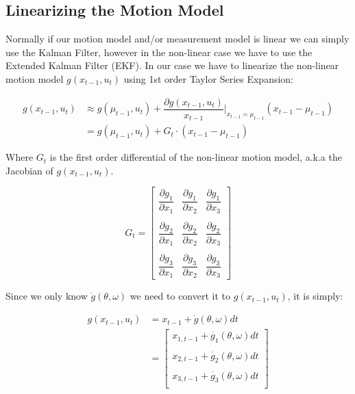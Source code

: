 \documentclass{article}
\begin{document}
\subsection{Linearizing the Motion Model}
\label{subsec:ekf_motion_model_linearization}
Normally if our motion model and/or measurement model is linear we can simply 
use the Kalman Filter, however in the non-linear case we have to use the 
Extended Kalman Filter (EKF). In our case we have to linearize the non-linear 
motion model $g(x_{t-1}, u_{t})$ using 1st order Taylor Series Expansion:

\begin{align}
	g(x_{t-1}, u_{t}) 
	& \approx 	
		g(\mu_{t - 1}, u_{t}) 
			+ \dfrac{\partial g(x_{t-1}, u_{t})}{x_{t - 1}} 
				\bigg|_{x_{t - 1} = \mu_{t - 1}}
			(x_{t - 1} - \mu_{t - 1}) \\
	& = g(\mu_{t - 1}, u_{t}) + G_{t} \cdot (x_{t - 1} - \mu_{t - 1})
\end{align}

Where $G_{t}$ is the first order differential of the non-linear motion model, 
a.k.a the Jacobian of $g(x_{t-1}, u_{t})$.

\begin{equation}
	G_{t} = \begin{bmatrix}
		\dfrac{\partial g_{1}}{\partial x_{1}}
		& \dfrac{\partial g_{1}}{\partial x_{2}} 
		& \dfrac{\partial g_{1}}{\partial x_{3}} \\ \\
		\dfrac{\partial g_{2}}{\partial x_{1}}
		& \dfrac{\partial g_{2}}{\partial x_{2}} 
		& \dfrac{\partial g_{2}}{\partial x_{3}} \\ \\
		\dfrac{\partial g_{3}}{\partial x_{1}}
		& \dfrac{\partial g_{3}}{\partial x_{2}} 
		& \dfrac{\partial g_{3}}{\partial x_{3}}
	\end{bmatrix}
\end{equation}

Since we only know $\dot{g}(\theta, \omega)$ we need to convert it to 
$g(x_{t-1}, u_{t})$, it is simply:

\begin{align}
	g(x_{t-1}, u_{t}) 
		&= x_{t - 1} + \dot{g}(\theta, \omega) dt \\
		&= \begin{bmatrix}
			x_{1, t - 1} + \dot{g_{1}}(\theta, \omega) dt \\ \\
			x_{2, t - 1} + \dot{g_{2}}(\theta, \omega) dt \\ \\
			x_{3, t - 1} + \dot{g_{3}}(\theta, \omega) dt \\
		\end{bmatrix}
\end{align}
\end{document}
